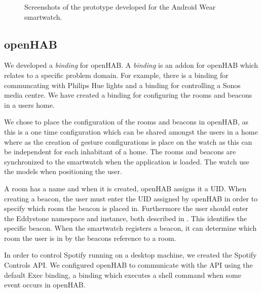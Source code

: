 \begin{figure}[!htb]
{    }
    \caption{Screenshots of the prototype developed for the Android Wear smartwatch.}
    \label{fig:implementation:prototype:screenshots}
\end{figure}

\subsection{openHAB}
\label{sec:implementation:prototype:openhab}

We developed a \emph{binding} for openHAB. A \emph{binding} is an addon for openHAB which relates to a specific problem domain. For example, there is a binding for communcating with Philips Hue lights and a binding for controlling a Sonos media centre. We have created a binding for configuring the rooms and beacons in a users home.

We chose to place the configuration of the rooms and beacons in openHAB, as this is a one time configuration which can be shared amongst the users in a home where as the creation of gesture configurations is place on the watch as this can be independent for each inhabitant of a home. The rooms and beacons are synchronized to the smartwatch when the application is loaded. The watch use the models when positioning the user.

A room has a name and when it is created, openHAB assigns it a UID. When creating a beacon, the user must enter the UID assigned by openHAB in order to specify which room the beacon is placed in. Furthermore the user should enter the Eddystone namespace and instance, both described in . This identifies the specific beacon. When the smartwatch registers a beacon, it can determine which room the user is in by the beacons reference to a room.

In order to control Spotify running on a desktop machine, we created the Spotify Controls API. We configured openHAB to communicate with the API using the default Exec binding, a binding which executes a shell command when some event occurs in openHAB.

